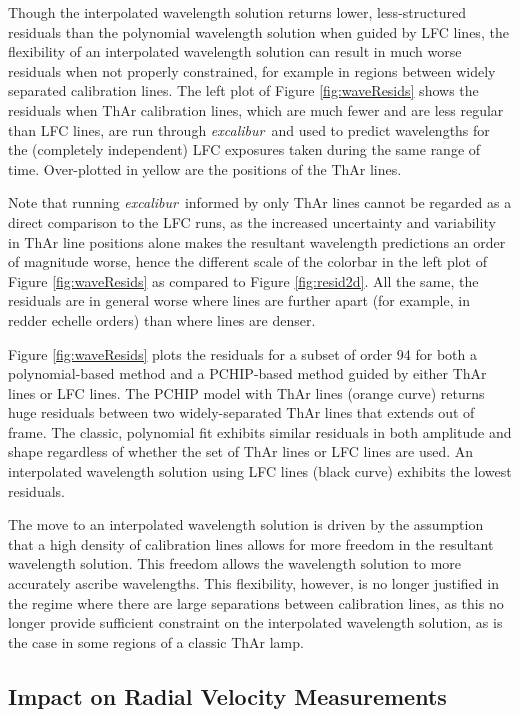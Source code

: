 \documentclass[modern]{aastex63}
\newcommand{\project}[1]{\textsl{#1}}
\newcommand{\name}{\project{excalibur}}
\begin{document}
Though the interpolated wavelength solution returns lower, less-structured residuals than the polynomial wavelength solution when guided by LFC lines, the flexibility of an interpolated wavelength solution can result in much worse residuals when not properly constrained, for example in regions between widely separated calibration lines.  The left plot of Figure \ref{fig:waveResids} shows the residuals when ThAr calibration lines, which are much fewer and are less regular than LFC lines, are run through \name\ and used to predict wavelengths for the (completely independent) LFC exposures taken during the same range of time.  Over-plotted in yellow are the positions of the ThAr lines. 

Note that running \name\ informed by only ThAr lines cannot be regarded as a direct comparison to the LFC runs, as the increased uncertainty and variability in ThAr line positions alone makes the resultant wavelength predictions an order of magnitude worse, hence the different scale of the colorbar in the left plot of Figure \ref{fig:waveResids} as compared to Figure \ref{fig:resid2d}.  All the same, the residuals are in general worse where lines are further apart (for example, in redder echelle orders) than where lines are denser.

Figure \ref{fig:waveResids} plots the residuals for a subset of order 94 for both a polynomial-based method and a PCHIP-based method guided by either ThAr lines or LFC lines.   The PCHIP model with ThAr lines (orange curve) returns huge residuals between two widely-separated ThAr lines that extends out of frame.  The classic, polynomial fit exhibits similar residuals in both amplitude and shape regardless of whether the set of ThAr lines or LFC lines are used.  An interpolated wavelength solution using LFC lines (black curve) exhibits the lowest residuals.

The move to an interpolated wavelength solution is driven by the assumption that a high density of calibration lines allows for more freedom in the resultant wavelength solution.  This freedom allows the wavelength solution to more accurately ascribe wavelengths.  This flexibility, however, is no longer justified in the regime where there are large separations between calibration lines, as this no longer provide sufficient constraint on the interpolated wavelength solution, as is the case in some regions of a classic ThAr lamp.

\subsection{Impact on Radial Velocity Measurements}\label{sec:test-rv}
\end{document}
